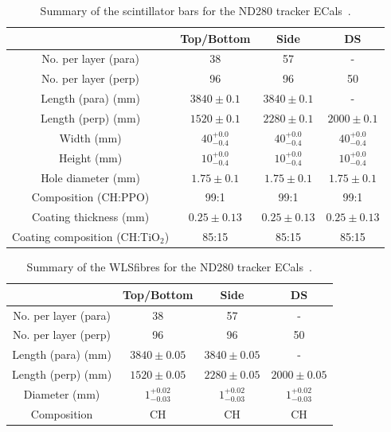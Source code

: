\begin{table}
  \begin{tabular}{ c c c c }
     & Top/Bottom & Side & DS \\ \hline \hline
  No. per layer (para) & 38 & 57 & - \\
  No. per layer (perp) & 96 & 96 & 50 \\
  Length (para) (mm) & $3840\pm0.1$ & $3840\pm0.1$ & - \\
  Length (perp) (mm) & $1520\pm0.1$ & $2280\pm0.1$ & $2000\pm0.1$ \\
  Width (mm) & $40^{+0.0}_{-0.4}$ & $40^{+0.0}_{-0.4}$& $40^{+0.0}_{-0.4}$ \\
  Height (mm) & $10^{+0.0}_{-0.4}$ & $10^{+0.0}_{-0.4}$& $10^{+0.0}_{-0.4}$ \\
  Hole diameter (mm) & $1.75\pm0.1$ & $1.75\pm0.1$ & $1.75\pm0.1$ \\
  Composition (CH:PPO) & 99:1 & 99:1 & 99:1 \\
  Coating thickness (mm) & $0.25\pm0.13$ & $0.25\pm0.13$ & $0.25\pm0.13$ \\
  Coating composition (CH:TiO$_2$) & 85:15 & 85:15 & 85:15 \\

  \end{tabular}
  \caption{Summary of the scintillator bars for the ND280 tracker ECals~\cite{1748-0221-8-10-P10019}.}
  \label{table:ScintillatorBarDimensions}
\end{table}

\begin{table}
  \begin{tabular}{ c c c c }
     & Top/Bottom & Side & DS \\ \hline \hline
  No. per layer (para) & 38 & 57 & - \\
  No. per layer (perp) & 96 & 96 & 50 \\
  Length (para) (mm) & $3840\pm0.05$ & $3840\pm0.05$ & - \\
  Length (perp) (mm) & $1520\pm0.05$ & $2280\pm0.05$ & $2000\pm0.05$ \\
  Diameter (mm) & $1^{+0.02}_{-0.03}$ & $1^{+0.02}_{-0.03}$ & $1^{+0.02}_{-0.03}$\\
  Composition & CH & CH & CH \\

  \end{tabular}
  \caption{Summary of the WLSfibres for the ND280 tracker ECals~\cite{1748-0221-8-10-P10019}.}
  \label{table:WLSFibreDimensions}
\end{table}



